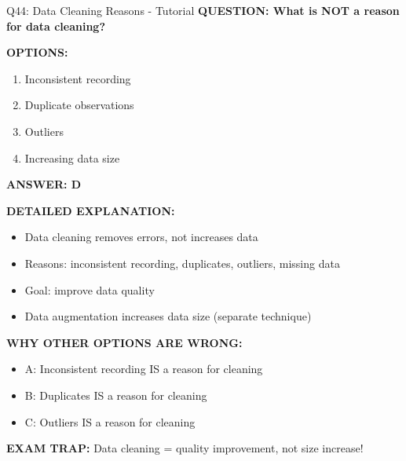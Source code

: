 \documentclass[8pt]{beamer}
\begin{document}
	\begin{frame}{Q44: Data Cleaning Reasons - Tutorial}
		\fontsize{6.5}{7.5}\selectfont
		\textbf{QUESTION: What is NOT a reason for data cleaning?}
		
		\vspace{0.1cm}
		\textbf{OPTIONS:}
		\begin{enumerate}
			\item Inconsistent recording
			\item Duplicate observations
			\item Outliers
			\item Increasing data size
		\end{enumerate}
		
		\vspace{0.1cm}
		\textcolor{myblue}{\textbf{ANSWER: D}}
		
		\vspace{0.1cm}
		\textbf{DETAILED EXPLANATION:}
		\begin{itemize}
			\item Data cleaning removes errors, not increases data
			\item Reasons: inconsistent recording, duplicates, outliers, missing data
			\item Goal: improve data quality
			\item Data augmentation increases data size (separate technique)
		\end{itemize}
		
		\vspace{0.1cm}
		\textcolor{myred}{\textbf{WHY OTHER OPTIONS ARE WRONG:}}
		\begin{itemize}
			\item \textcolor{myred}{A:} Inconsistent recording IS a reason for cleaning
			\item \textcolor{myred}{B:} Duplicates IS a reason for cleaning
			\item \textcolor{myred}{C:} Outliers IS a reason for cleaning
		\end{itemize}
		
		\textcolor{myred}{\textbf{EXAM TRAP:}} Data cleaning = \textcolor{myblue}{quality improvement, not size increase}!
	\end{frame}
	
\end{document}
